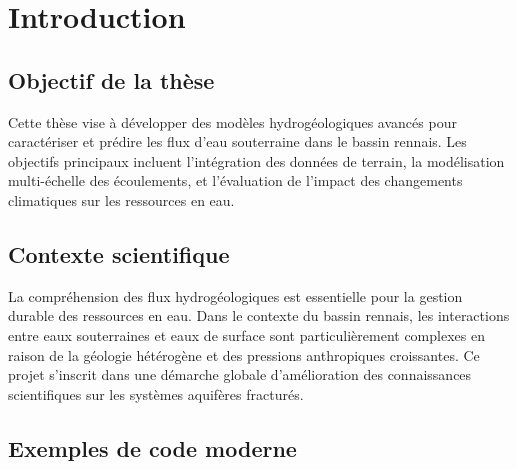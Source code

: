 
\chapter{Introduction}

\minitoc

\newpage

\section{Objectif de la thèse}

Cette thèse vise à développer des modèles hydrogéologiques avancés pour caractériser et prédire les flux d'eau souterraine dans le bassin rennais. Les objectifs principaux incluent l'intégration des données de terrain, la modélisation multi-échelle des écoulements, et l'évaluation de l'impact des changements climatiques sur les ressources en eau.

\section{Contexte scientifique}

La compréhension des flux hydrogéologiques est essentielle pour la gestion durable des ressources en eau. Dans le contexte du bassin rennais, les interactions entre eaux souterraines et eaux de surface sont particulièrement complexes en raison de la géologie hétérogène et des pressions anthropiques croissantes. Ce projet s'inscrit dans une démarche globale d'amélioration des connaissances scientifiques sur les systèmes aquifères fracturés.

\section{Exemples de code moderne}


